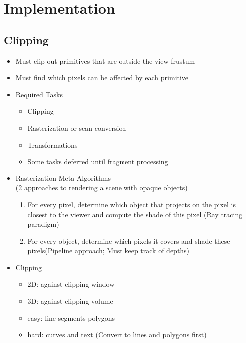 \documentclass[11pt,a4paper]{article}
\begin{document}
\section{Implementation}
	\subsection{Clipping}
		\begin{itemize}
			\item Must clip out primitives that are outside the view frustum
			\item Must find which pixels can be affected by each primitive
			\item Required Tasks
				\begin{itemize}
					\item Clipping
					\item Rasterization or scan conversion
					\item Transformations 
					\item Some tasks deferred until fragment processing
				\end{itemize}
			\item Rasterization Meta Algorithms\\(2 approaches to rendering a scene with opaque objects)
				\begin{enumerate}
					\item For every pixel, determine which object that projects on the pixel is closest to the viewer and compute the shade of this pixel (Ray tracing paradigm)
					\item For every object, determine which pixels it covers and shade these pixels(Pipeline approach; Must keep track of depths)
				\end{enumerate}
			\item Clipping
				\begin{itemize}
					\item 2D: against clipping window
					\item 3D: against clipping volume
					\item easy: line segments polygons
					\item hard: curves and text (Convert to lines and polygons first)

\end{itemize}
\end{itemize}
\end{document}
